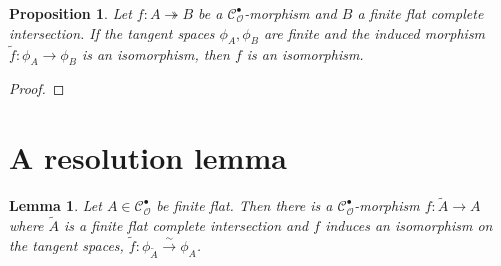 \documentclass{article}
\theoremstyle{plain}%
\newtheorem{lemma}{Lemma}[section]
\newtheorem{proposition}{Proposition}[section]
\theoremstyle{definition}
\theoremstyle{remark}
\newcommand{\cob}{\mathcal{C}_\mathcal{O}^\bullet}
\begin{document}
\begin{proposition}
    Let \(f\colon A \twoheadrightarrow B\) be a \(\cob\)-morphism and \(B\) a finite flat complete intersection.
    If the tangent spaces \(\phi_A, \phi_B\) are finite and 
    the induced morphism \(\tilde f\colon \phi_A \to \phi_B\) is an isomorphism,
    then \(f\) is an isomorphism.
\end{proposition}
\begin{proof}
    
\end{proof}

\section{A resolution lemma}

\begin{lemma}\label{lem:resolution}\cite[theorem 5.26]{darmon1995fermat}
    Let \(A \in \cob\) be finite flat. Then there is a \(\cob\)-morphism \(f\colon \tilde A \to A\) 
    where \(\tilde A\) is a finite flat complete intersection and \(f\) induces an isomorphism on the tangent spaces,
    \(\tilde f \colon \phi_{\tilde{A}} \xrightarrow{\sim} \phi_A\).
\end{lemma}
\end{document}
